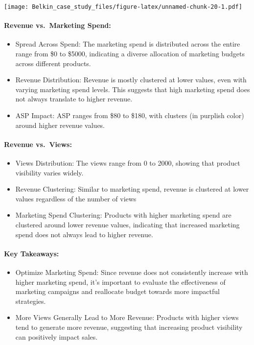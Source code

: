 \documentclass[
]{article}
\providecommand{\tightlist}{%
  \setlength{\itemsep}{0pt}\setlength{\parskip}{0pt}}
\begin{document}
\texttt{[image: Belkin\_case\_study\_files/figure-latex/unnamed-chunk-20-1.pdf]}

\paragraph{Revenue vs.~Marketing
Spend:}\label{revenue-vs.-marketing-spend}

\begin{itemize}
\tightlist
\item
  Spread Across Spend: The marketing spend is distributed across the
  entire range from \$0 to \$5000, indicating a diverse allocation of
  marketing budgets across different products.
\item
  Revenue Distribution: Revenue is mostly clustered at lower values,
  even with varying marketing spend levels. This suggests that high
  marketing spend does not always translate to higher revenue.
\item
  ASP Impact: ASP ranges from \$80 to \$180, with clusters (in purplish
  color) around higher revenue values.
\end{itemize}

\paragraph{Revenue vs.~Views:}\label{revenue-vs.-views}

\begin{itemize}
\tightlist
\item
  Views Distribution: The views range from 0 to 2000, showing that
  product visibility varies widely.
\item
  Revenue Clustering: Similar to marketing spend, revenue is clustered
  at lower values regardless of the number of views
\item
  Marketing Spend Clustering: Products with higher marketing spend are
  clustered around lower revenue values, indicating that increased
  marketing spend does not always lead to higher revenue.
\end{itemize}

\paragraph{Key Takeaways:}\label{key-takeaways}

\begin{itemize}
\tightlist
\item
  Optimize Marketing Spend: Since revenue does not consistently increase
  with higher marketing spend, it's important to evaluate the
  effectiveness of marketing campaigns and reallocate budget towards
  more impactful strategies.
\item
  More Views Generally Lead to More Revenue: Products with higher views
  tend to generate more revenue, suggesting that increasing product
  visibility can positively impact sales.
\end{itemize}
\end{document}

